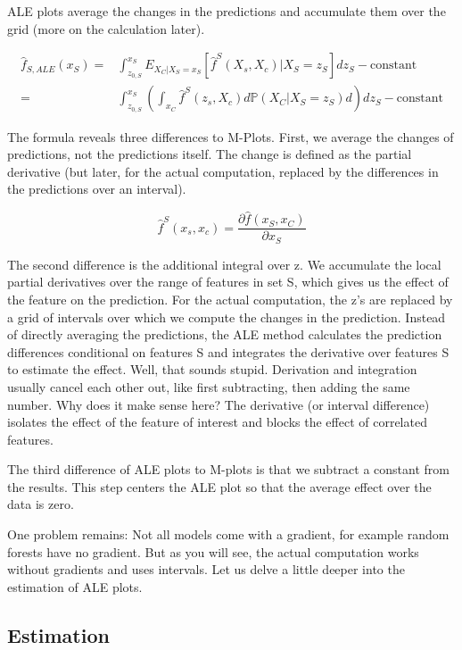 \documentclass[
  12pt,
]{krantz}
\begin{document}
ALE plots average the changes in the predictions and accumulate them over the grid (more on the calculation later).

\begin{align*}
\hat{f}_{S,ALE}(x_S)=&\int_{z_{0,S}}^{x_S}E_{X_C|X_S = x_S}\left[\hat{f}^S(X_s,X_c)|X_S=z_S\right]dz_S-\text{constant}\\
 = & \int_{z_{0,S}}^{x_S}(\int_{x_C}\hat{f}^S(z_s,X_c)d\mathbb{P}(X_C|X_S = z_S)d{})dz_S-\text{constant}
\end{align*}

The formula reveals three differences to M-Plots.
First, we average the changes of predictions, not the predictions itself.
The change is defined as the partial derivative (but later, for the actual computation, replaced by the differences in the predictions over an interval).

\[\hat{f}^S(x_s,x_c)=\frac{\partial\hat{f}(x_S,x_C)}{\partial{}x_S}\]

The second difference is the additional integral over z.
We accumulate the local partial derivatives over the range of features in set S, which gives us the effect of the feature on the prediction.
For the actual computation, the z's are replaced by a grid of intervals over which we compute the changes in the prediction.
Instead of directly averaging the predictions, the ALE method calculates the prediction differences conditional on features S and integrates the derivative over features S to estimate the effect.
Well, that sounds stupid.
Derivation and integration usually cancel each other out, like first subtracting, then adding the same number.
Why does it make sense here?
The derivative (or interval difference) isolates the effect of the feature of interest and blocks the effect of correlated features.

The third difference of ALE plots to M-plots is that we subtract a constant from the results.
This step centers the ALE plot so that the average effect over the data is zero.

One problem remains:
Not all models come with a gradient, for example random forests have no gradient.
But as you will see, the actual computation works without gradients and uses intervals.
Let us delve a little deeper into the estimation of ALE plots.

\hypertarget{estimation}{%
\subsection{Estimation}\label{estimation}}
\end{document}
